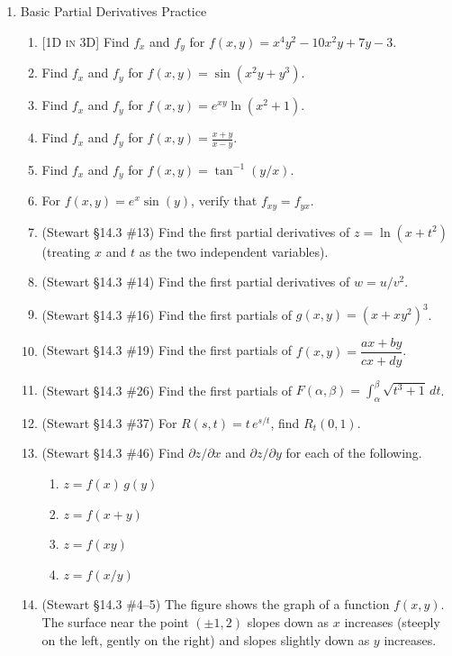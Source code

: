 \documentclass[12pt]{article}
\newcommand{\dimtag}[1]{{\footnotesize\textsc{[#1]}}\;}
\begin{document}
\begin{enumerate}
\item Basic Partial Derivatives Practice
    \begin{enumerate}
        \item \dimtag{1D in 3D} Find $f_x$ and $f_y$ for $f(x, y) = x^4 y^2 - 10x^2 y + 7y - 3$.
        \item Find $f_x$ and $f_y$ for $f(x, y) = \sin(x^2 y + y^3)$.
        \item Find $f_x$ and $f_y$ for $f(x, y) = e^{xy} \ln(x^2 + 1)$.
        \item Find $f_x$ and $f_y$ for $f(x, y) = \frac{x+y}{x-y}$.
        \item Find $f_x$ and $f_y$ for $f(x, y) = \tan^{-1}(y/x)$.
        \item For $f(x, y) = e^{x} \sin(y)$, verify that $f_{xy} = f_{yx}$.
        \item (Stewart \S14.3 \#13) Find the first partial derivatives of $z = \ln(x + t^2)$ (treating $x$ and $t$ as the two independent variables).
        \item (Stewart \S14.3 \#14) Find the first partial derivatives of $w = u/v^2$.
        \item (Stewart \S14.3 \#16) Find the first partials of $g(x,y) = (x + xy^2)^3$.
        \item (Stewart \S14.3 \#19) Find the first partials of $f(x,y) = \dfrac{ax+by}{cx+dy}$.
        \item (Stewart \S14.3 \#26) Find the first partials of $F(\alpha,\beta) = \displaystyle\int_\alpha^\beta \sqrt{t^3 + 1}\, dt$.
        \item (Stewart \S14.3 \#37) For $R(s,t) = t\,e^{s/t}$, find $R_t(0,1)$.
        \item (Stewart \S14.3 \#46) Find $\partial z/\partial x$ and $\partial z/\partial y$ for each of the following.
        \begin{enumerate}
            \item $z = f(x)\,g(y)$
            \item $z = f(x+y)$
            \item $z = f(xy)$
            \item $z = f(x/y)$
        \end{enumerate}
        \item (Stewart \S14.3 \#4--5) The figure shows the graph of a function $f(x,y)$. The surface near the point $(\pm 1, 2)$ slopes down as $x$ increases (steeply on the left, gently on the right) and slopes slightly down as $y$ increases.
        \begin{center}

\end{center}
\end{enumerate}
\end{enumerate}
\end{document}
